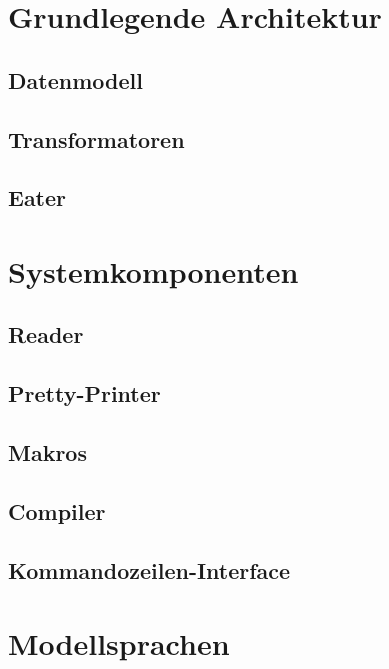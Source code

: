 \documentclass[a4paper, bibgerm]{article}
\begin{document}
\section{Grundlegende Architektur}
\label{sec:basic}

\subsection{Datenmodell}
\label{sec:basic:model}

\subsection{Transformatoren}
\label{sec:basic:trans}

\subsection{Eater}
\label{sec:basic:eater}

\section{Systemkomponenten}
\label{sec:system}

\subsection{Reader}
\label{sec:system:reader}

\subsection{Pretty-Printer}
\label{sec:system:pretty}

\subsection{Makros}
\label{sec:system:macros}

\subsection{Compiler}
\label{sec:system:compiler}

\subsection{Kommandozeilen-Interface}
\label{sec:system:mage}

\section{Modellsprachen}
\label{sec:lang}
\end{document}
